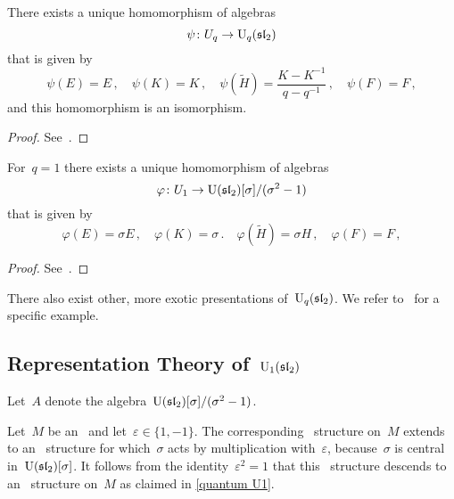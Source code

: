 \documentclass[a4paper, 11pt, oneside]{scrartcl}
\begin{document}
\begin{proposition}
  There exists a unique homomorphism of algebras
  \[
    \psi
    \colon
    U_q
    \to
    \operatorname{U}_q(\mathfrak{sl}_2)
  \]
  that is given by
  \[
    \psi(E) = E \,,
    \quad
    \psi(K) = K \,,
    \quad
    \psi(\widetilde{H}) = \frac{K - K^{-1}}{q - q^{-1}} \,,
    \quad
    \psi(F) = F \,,
  \]
  and this homomorphism is an isomorphism.
\end{proposition}

\begin{proof}
 See~{\cite[Proposition~VI.2.1]{kassel_quantum}}.
\end{proof}

\begin{proposition}
  For~$q = 1$ there exists a unique homomorphism of algebras
  \[
    \varphi
    \colon
    U_1
    \to
    \operatorname{U}(\mathfrak{sl}_2)[\sigma]/(\sigma^2 - 1)
  \]
  that is given by
  \[
    \varphi(E) = \sigma E \,,
    \quad
    \varphi(K) = \sigma \,.
    \quad
    \varphi(\widetilde{H}) = \sigma H \,,
    \quad
    \varphi(F) = F \,,
  \]
\end{proposition}

\begin{proof}
  See~\cite[Proof of Proposition~VI.2.2]{kassel_quantum}.
\end{proof}

\begin{remark}
  There also exist other, more exotic presentations of~$\operatorname{U}_q(\mathfrak{sl}_2)$.
  We refer to~\cite{equitable_presentation} for a specific example.
\end{remark}




\subsection{Representation Theory of~\texorpdfstring{$\operatorname{U}_1(\mathfrak{sl}_2)$}{U1(sl2)}}
\label{representation theory of U1}

Let~$A$ denote the algebra~$\operatorname{U}(\mathfrak{sl}_2)[\sigma]/(\sigma^2 - 1)$.

Let~$M$ be an~ and let~$\varepsilon \in \{ 1, -1 \}$.
The corresponding~ structure on~$M$ extends to an~ structure for which~$\sigma$ acts by multiplication with~$\varepsilon$, because~$\sigma$ is central in~$\operatorname{U}(\mathfrak{sl}_2)[\sigma]$.
It follows from the identity~$\varepsilon^2 = 1$ that this~ structure descends to an~ structure on~$M$ as claimed in \cref{quantum U1}.
\end{document}
